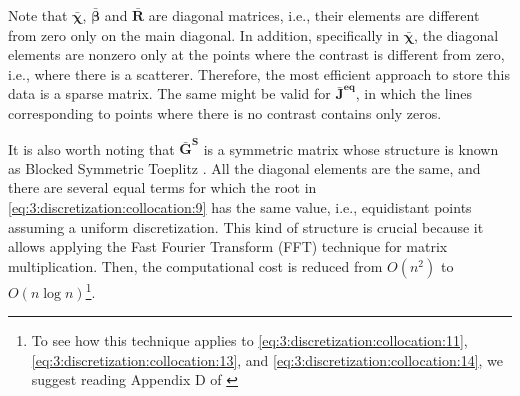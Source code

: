 			Note that $\boldsymbol{\bar{\chi}}$, $\boldsymbol{\bar{\beta}}$ and $\mathbf{\bar{R}}$ are diagonal matrices, i.e., their elements are different from zero only on the main diagonal. In addition, specifically in $\boldsymbol{\bar{\chi}}$, the diagonal elements are nonzero only at the points where the contrast is different from zero, i.e., where there is a scatterer. Therefore, the most efficient approach to store this data is a sparse matrix. The same might be valid for $\mathbf{\bar{J}^{eq}}$, in which the lines corresponding to points where there is no contrast contains only zeros.
			
			It is also worth noting that $\mathbf{\bar{G}^S}$ is a symmetric matrix whose structure is known as Blocked Symmetric Toeplitz \citep{botthcer2000toeplitz}. All the diagonal elements are the same, and there are several equal terms for which the root in \eqref{eq:3:discretization:collocation:9} has the same value, i.e., equidistant points assuming a uniform discretization. This kind of structure is crucial because it allows applying the Fast Fourier Transform (FFT) technique for matrix multiplication. Then, the computational cost is reduced from $O(n^2)$ to $O(n\log n)$\footnote{To see how this technique applies to \eqref{eq:3:discretization:collocation:11}, \eqref{eq:3:discretization:collocation:13}, and \eqref{eq:3:discretization:collocation:14}, we suggest reading Appendix D of \citep{chen2017}}.
			
